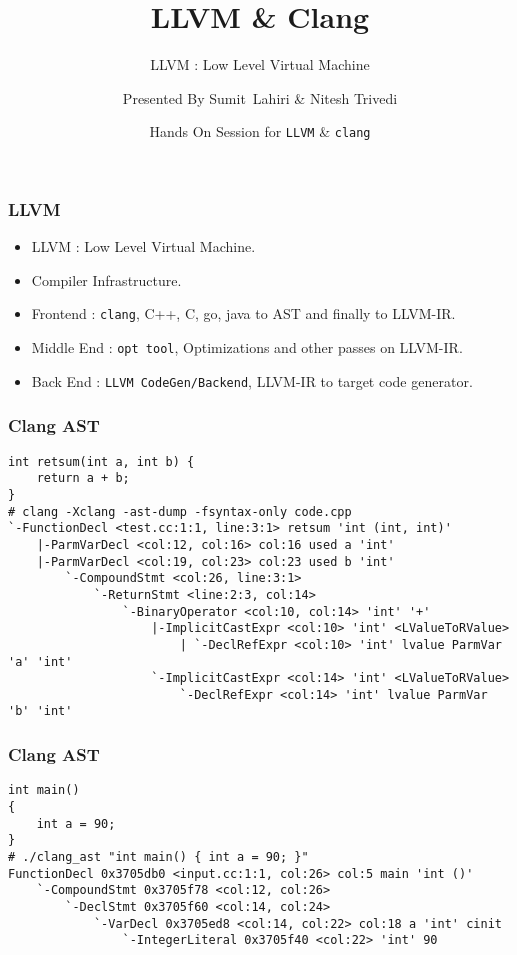 \documentclass{beamer}
\title[\url{https://llvm.org/}] %
{LLVM \& Clang}
\subtitle{LLVM : Low Level Virtual Machine}
\author[LLVM \& Clang] %
{Presented By Sumit~Lahiri\inst{1} \& Nitesh Trivedi\inst{1}}
\institute[VFU] %
{
	\inst{1}%
	IIT Kanpur
}
\date[] %
{Hands On Session for \texttt{LLVM} \& \texttt{clang}}
\begin{document}
\frame{\titlepage}

\begin{frame}
	\frametitle{LLVM}
	\begin{itemize}
		\item LLVM : Low Level Virtual Machine. \pause
		\item Compiler Infrastructure. \pause
		\item Frontend : \texttt{clang}, C++, C, go, java to AST and finally to LLVM-IR. \pause
		\item Middle End : \texttt{opt tool}, Optimizations and other passes on LLVM-IR. \pause
		\item Back End : \texttt{LLVM CodeGen/Backend}, LLVM-IR to target code generator.  \pause
	\end{itemize}
\end{frame}

\begin{frame}[fragile]
	\frametitle{Clang AST}
	\begin{verbatim}
int retsum(int a, int b) {
	return a + b;
}
# clang -Xclang -ast-dump -fsyntax-only code.cpp
`-FunctionDecl <test.cc:1:1, line:3:1> retsum 'int (int, int)'
	|-ParmVarDecl <col:12, col:16> col:16 used a 'int'
	|-ParmVarDecl <col:19, col:23> col:23 used b 'int'
		`-CompoundStmt <col:26, line:3:1>
			`-ReturnStmt <line:2:3, col:14>
				`-BinaryOperator <col:10, col:14> 'int' '+'
					|-ImplicitCastExpr <col:10> 'int' <LValueToRValue>
						| `-DeclRefExpr <col:10> 'int' lvalue ParmVar 'a' 'int'
					`-ImplicitCastExpr <col:14> 'int' <LValueToRValue>
						`-DeclRefExpr <col:14> 'int' lvalue ParmVar 'b' 'int'
	\end{verbatim}
\end{frame}

\begin{frame}[fragile]
	\frametitle{Clang AST}
	\begin{verbatim}
int main() 
{ 
	int a = 90;
}
# ./clang_ast "int main() { int a = 90; }"
FunctionDecl 0x3705db0 <input.cc:1:1, col:26> col:5 main 'int ()'
	`-CompoundStmt 0x3705f78 <col:12, col:26>
		`-DeclStmt 0x3705f60 <col:14, col:24>
			`-VarDecl 0x3705ed8 <col:14, col:22> col:18 a 'int' cinit
				`-IntegerLiteral 0x3705f40 <col:22> 'int' 90
	\end{verbatim}
\end{frame}
\end{document}
